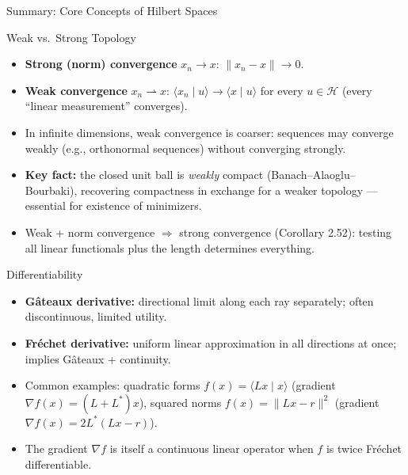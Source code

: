 \documentclass[aspectratio=169,10pt]{beamer}
\newcommand{\Hil}{\mathcal{H}}
\newcommand{\wto}{\rightharpoonup}
\newcommand{\ip}[2]{\langle #1 \mid #2 \rangle}
\begin{document}
\begin{frame}[allowframebreaks]{Summary: Core Concepts of Hilbert Spaces}
  \framebreak

  \begin{block}{Weak vs.\ Strong Topology}
    \begin{itemize}
      \item \textbf{Strong (norm) convergence} $x_n \to x$: $\|x_n-x\| \to 0$.
      \item \textbf{Weak convergence} $x_n \wto x$: $\ip{x_n}{u} \to \ip{x}{u}$
        for every $u\in\Hil$ (every ``linear measurement'' converges).
      \item In infinite dimensions, weak convergence is coarser: sequences may
        converge weakly (e.g., orthonormal sequences) without converging strongly.
      \item \textbf{Key fact:} the closed unit ball is \emph{weakly} compact
        (Banach--Alaoglu--Bourbaki), recovering compactness in exchange for a
        weaker topology --- essential for existence of minimizers.
      \item Weak + norm convergence $\Rightarrow$ strong convergence
        (Corollary 2.52): testing all linear functionals plus the length determines
        everything.
    \end{itemize}
  \end{block}

  \framebreak

  \begin{block}{Differentiability}
    \begin{itemize}
      \item \textbf{G\^ateaux derivative:} directional limit along each ray
        separately; often discontinuous, limited utility.
      \item \textbf{Fr\'echet derivative:} uniform linear approximation in all
        directions at once; implies G\^ateaux + continuity.
      \item Common examples: quadratic forms $f(x)=\ip{Lx}{x}$ (gradient
        $\nabla f(x)=(L+L^*)x$), squared norms $f(x)=\|Lx-r\|^2$ (gradient
        $\nabla f(x)=2L^*(Lx-r)$).
      \item The gradient $\nabla f$ is itself a continuous linear operator
        when $f$ is twice Fr\'echet differentiable.
    \end{itemize}
  \end{block}

\end{frame}
\end{document}

